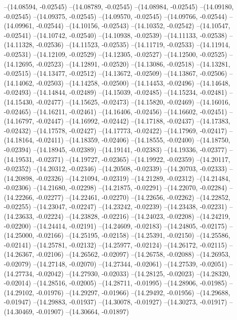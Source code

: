 --(14.08594, -0.02545)
--(14.08789, -0.02545)
--(14.08984, -0.02545)
--(14.09180, -0.02545)
--(14.09375, -0.02545)
--(14.09570, -0.02545)
--(14.09766, -0.02544)
--(14.09961, -0.02544)
--(14.10156, -0.02543)
--(14.10352, -0.02542)
--(14.10547, -0.02541)
--(14.10742, -0.02540)
--(14.10938, -0.02539)
--(14.11133, -0.02538)
--(14.11328, -0.02536)
--(14.11523, -0.02535)
--(14.11719, -0.02533)
--(14.11914, -0.02531)
--(14.12109, -0.02529)
--(14.12305, -0.02527)
--(14.12500, -0.02525)
--(14.12695, -0.02523)
--(14.12891, -0.02520)
--(14.13086, -0.02518)
--(14.13281, -0.02515)
--(14.13477, -0.02512)
--(14.13672, -0.02509)
--(14.13867, -0.02506)
--(14.14062, -0.02503)
--(14.14258, -0.02500)
--(14.14453, -0.02496)
--(14.14648, -0.02493)
--(14.14844, -0.02489)
--(14.15039, -0.02485)
--(14.15234, -0.02481)
--(14.15430, -0.02477)
--(14.15625, -0.02473)
--(14.15820, -0.02469)
--(14.16016, -0.02465)
--(14.16211, -0.02461)
--(14.16406, -0.02456)
--(14.16602, -0.02451)
--(14.16797, -0.02447)
--(14.16992, -0.02442)
--(14.17188, -0.02437)
--(14.17383, -0.02432)
--(14.17578, -0.02427)
--(14.17773, -0.02422)
--(14.17969, -0.02417)
--(14.18164, -0.02411)
--(14.18359, -0.02406)
--(14.18555, -0.02400)
--(14.18750, -0.02394)
--(14.18945, -0.02389)
--(14.19141, -0.02383)
--(14.19336, -0.02377)
--(14.19531, -0.02371)
--(14.19727, -0.02365)
--(14.19922, -0.02359)
--(14.20117, -0.02352)
--(14.20312, -0.02346)
--(14.20508, -0.02339)
--(14.20703, -0.02333)
--(14.20898, -0.02326)
--(14.21094, -0.02319)
--(14.21289, -0.02312)
--(14.21484, -0.02306)
--(14.21680, -0.02298)
--(14.21875, -0.02291)
--(14.22070, -0.02284)
--(14.22266, -0.02277)
--(14.22461, -0.02270)
--(14.22656, -0.02262)
--(14.22852, -0.02255)
--(14.23047, -0.02247)
--(14.23242, -0.02239)
--(14.23438, -0.02231)
--(14.23633, -0.02224)
--(14.23828, -0.02216)
--(14.24023, -0.02208)
--(14.24219, -0.02200)
--(14.24414, -0.02191)
--(14.24609, -0.02183)
--(14.24805, -0.02175)
--(14.25000, -0.02166)
--(14.25195, -0.02158)
--(14.25391, -0.02150)
--(14.25586, -0.02141)
--(14.25781, -0.02132)
--(14.25977, -0.02124)
--(14.26172, -0.02115)
--(14.26367, -0.02106)
--(14.26562, -0.02097)
--(14.26758, -0.02088)
--(14.26953, -0.02079)
--(14.27148, -0.02070)
--(14.27344, -0.02061)
--(14.27539, -0.02051)
--(14.27734, -0.02042)
--(14.27930, -0.02033)
--(14.28125, -0.02023)
--(14.28320, -0.02014)
--(14.28516, -0.02005)
--(14.28711, -0.01995)
--(14.28906, -0.01985)
--(14.29102, -0.01976)
--(14.29297, -0.01966)
--(14.29492, -0.01956)
--(14.29688, -0.01947)
--(14.29883, -0.01937)
--(14.30078, -0.01927)
--(14.30273, -0.01917)
--(14.30469, -0.01907)
--(14.30664, -0.01897)

